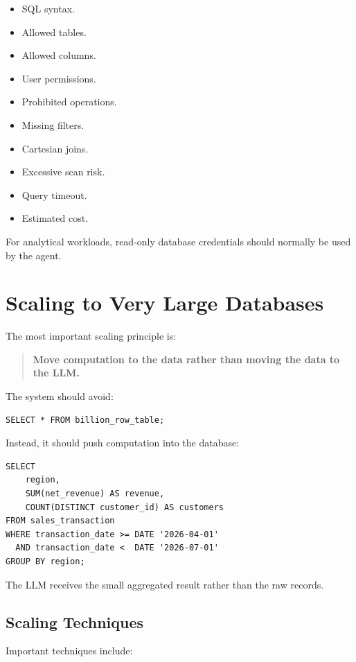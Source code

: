\documentclass[11pt,a4paper]{article}
\newcommand{\important}[1]{\textbf{#1}}
\begin{document}
\begin{itemize}
    \item SQL syntax.
    \item Allowed tables.
    \item Allowed columns.
    \item User permissions.
    \item Prohibited operations.
    \item Missing filters.
    \item Cartesian joins.
    \item Excessive scan risk.
    \item Query timeout.
    \item Estimated cost.
\end{itemize}

For analytical workloads, read-only database credentials should normally be
used by the agent.

\section{Scaling to Very Large Databases}

The most important scaling principle is:

\begin{quote}
\important{Move computation to the data rather than moving the data to the
LLM.}
\end{quote}

The system should avoid:

\begin{lstlisting}
SELECT * FROM billion_row_table;
\end{lstlisting}

Instead, it should push computation into the database:

\begin{lstlisting}
SELECT
    region,
    SUM(net_revenue) AS revenue,
    COUNT(DISTINCT customer_id) AS customers
FROM sales_transaction
WHERE transaction_date >= DATE '2026-04-01'
  AND transaction_date <  DATE '2026-07-01'
GROUP BY region;
\end{lstlisting}

The LLM receives the small aggregated result rather than the raw records.

\subsection{Scaling Techniques}

Important techniques include:
\end{document}
